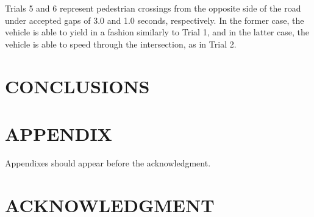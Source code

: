 \documentclass[letterpaper, 10 pt, conference]{ieeeconf}  %
\begin{document}
Trials 5 and 6 represent pedestrian crossings from the opposite side of the road under accepted gaps of 3.0 and 1.0 seconds, respectively. In the former case, the vehicle is able to yield in a fashion similarly to Trial 1, and in the latter case, the vehicle is able to speed through the intersection, as in Trial 2. 

\section{CONCLUSIONS}


\addtolength{\textheight}{-12cm}   %







\section*{APPENDIX}

Appendixes should appear before the acknowledgment.

\section*{ACKNOWLEDGMENT}










\end{document}
